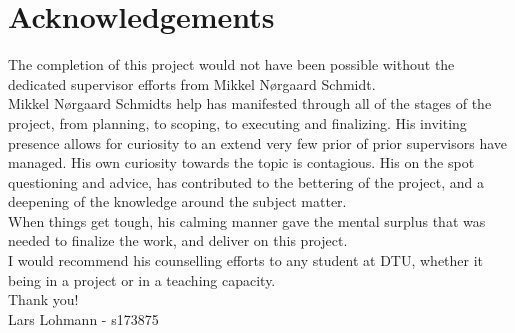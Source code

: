 \newpage
\section{Acknowledgements}
The completion of this project would not have been possible without the dedicated supervisor efforts from
Mikkel Nørgaard Schmidt.\\

Mikkel Nørgaard Schmidts help has manifested through all of the stages of the project, from planning, to scoping,
to executing and finalizing. His inviting presence allows for curiosity to an extend very few prior of prior
supervisors have managed. His own curiosity towards the topic is contagious. His on the spot questioning and
advice, has contributed to the bettering of the project, and a deepening of the knowledge around the subject matter. \\

When things get tough, his calming manner gave the mental surplus that was needed to finalize the work, and deliver
on this project. \\

I would recommend his counselling efforts to any student at DTU, whether it being in a project or in a teaching capacity.\\

Thank you!\\

Lars Lohmann - s173875
\newpage